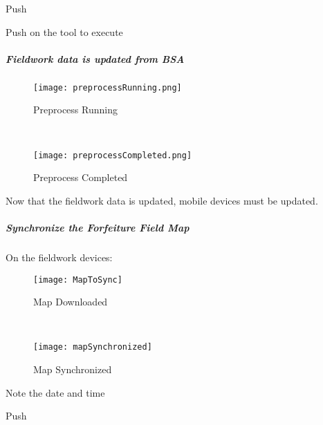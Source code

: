  {\bigbtn Push   \lookArrow} 

 {\bigbtn Push  on the tool to execute  \lookArrow} 

\clearpage


\subparagraph*{Fieldwork data is updated from BSA}




  \begin{figure}[h!]

\centering
     \texttt{[image: preprocessRunning.png]}
\caption{Preprocess Running}
  \vspace{.5in}
 
  \HRule \\[.4cm] %
  \vspace{.5in}
    
     \texttt{[image: preprocessCompleted.png]}
\caption{Preprocess Completed}
 \end{figure}


\noindent Now that the fieldwork data is updated, mobile devices must be updated. 



\clearpage


 \subparagraph{Synchronize the Forfeiture Field Map}
  \vspace{.2in}
  
\noindent On the fieldwork devices:

 \begin{wrapfigure}{r}{0.6\textwidth}
 \centering
     \texttt{[image: MapToSync]}
 \vspace{-.2in}
 
 \caption{Map Downloaded}
 \vspace{.1in}

 \HRule \\[.4cm] %
 
 \vspace{.1in}

     \texttt{[image: mapSynchronized]}
 \vspace{.2in}

 \caption{Map Synchronized}
 \end{wrapfigure}
 \vspace{.5in}
 

{\smallbtn Note the date and time}
 \vspace{.5in}

{\bigbtn Push   \lookArrow}

